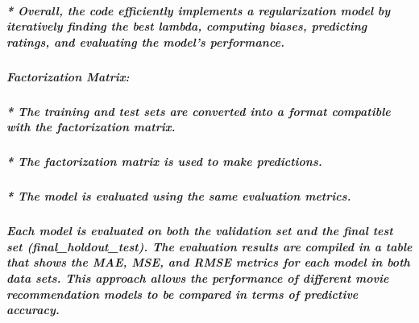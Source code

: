\documentclass[
]{article}
\begin{document}
\hypertarget{overall-the-code-efficiently-implements-a-regularization-model-by-iteratively-finding-the-best-lambda-computing-biases-predicting-ratings-and-evaluating-the-models-performance.}{%
\subparagraph{* Overall, the code efficiently implements a
regularization model by iteratively finding the best lambda, computing
biases, predicting ratings, and evaluating the model's
performance.}\label{overall-the-code-efficiently-implements-a-regularization-model-by-iteratively-finding-the-best-lambda-computing-biases-predicting-ratings-and-evaluating-the-models-performance.}}

\hypertarget{factorization-matrix}{%
\subparagraph{\texorpdfstring{\textbf{Factorization
Matrix:}}{Factorization Matrix:}}\label{factorization-matrix}}

\hypertarget{the-training-and-test-sets-are-converted-into-a-format-compatible-with-the-factorization-matrix.}{%
\subparagraph{* The training and test sets are converted into a format
compatible with the factorization
matrix.}\label{the-training-and-test-sets-are-converted-into-a-format-compatible-with-the-factorization-matrix.}}

\hypertarget{the-factorization-matrix-is-used-to-make-predictions.}{%
\subparagraph{* The factorization matrix is used to make
predictions.}\label{the-factorization-matrix-is-used-to-make-predictions.}}

\hypertarget{the-model-is-evaluated-using-the-same-evaluation-metrics.-2}{%
\subparagraph{* The model is evaluated using the same evaluation
metrics.}\label{the-model-is-evaluated-using-the-same-evaluation-metrics.-2}}

\hypertarget{each-model-is-evaluated-on-both-the-validation-set-and-the-final-test-set-final_holdout_test.-the-evaluation-results-are-compiled-in-a-table-that-shows-the-mae-mse-and-rmse-metrics-for-each-model-in-both-data-sets.-this-approach-allows-the-performance-of-different-movie-recommendation-models-to-be-compared-in-terms-of-predictive-accuracy.}{%
\subparagraph{Each model is evaluated on both the validation set and the
final test set (final\_holdout\_test). The evaluation results are
compiled in a table that shows the MAE, MSE, and RMSE metrics for each
model in both data sets. This approach allows the performance of
different movie recommendation models to be compared in terms of
predictive
accuracy.}\label{each-model-is-evaluated-on-both-the-validation-set-and-the-final-test-set-final_holdout_test.-the-evaluation-results-are-compiled-in-a-table-that-shows-the-mae-mse-and-rmse-metrics-for-each-model-in-both-data-sets.-this-approach-allows-the-performance-of-different-movie-recommendation-models-to-be-compared-in-terms-of-predictive-accuracy.}}
\end{document}
